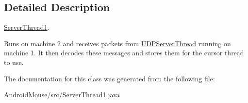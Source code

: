 \subsection{Detailed Description}
\hyperlink{class_server_thread1}{Server\+Thread1}. 

Runs on machine 2 and receives packets from \hyperlink{class_u_d_p_server_thread}{U\+D\+P\+Server\+Thread} running on machine 1. It then decodes these messages and stores them for the cursor thread to use. 

The documentation for this class was generated from the following file\+:\begin{DoxyCompactItemize}
\item 
Android\+Mouse/src/Server\+Thread1.\+java\end{DoxyCompactItemize}
